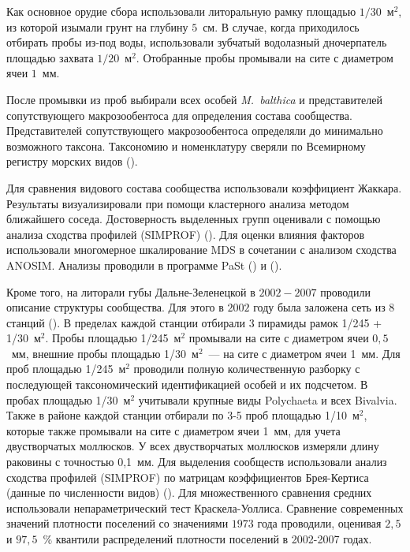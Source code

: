 Как основное орудие сбора использовали литоральную рамку площадью $1/30$~м$^2$, из которой изымали грунт на глубину $5$~см. 
В случае, когда приходилось отбирать пробы из-под воды, использовали зубчатый водолазный дночерпатель площадью захвата $1/20$~м$^2$.
Отобранные пробы промывали на сите с диаметром ячеи $1$~мм. 

После промывки из   проб   выбирали   всех   особей  {\it M.~balthica}  и   представителей   сопутствующего макрозообентоса    для   определения   состава   сообщества.
Представителей   сопутствующего макрозообентоса  определяли   до   минимально   возможного   таксона. Таксономию и номенклатуру сверяли по Всемирному регистру морских видов (\cite{WoRMS}).

Для сравнения видового состава сообщества использовали коэффициент Жаккара. 
Результаты визуализировали при помощи  кластерного анализа методом ближайшего соседа. 
Достоверность выделенных групп оценивали с помощью анализа сходства профилей (SIMPROF) (\cite{Clarke_et_al_2008}).
Для оценки влияния факторов использовали многомерное шкалирование MDS в сочетании с анализом сходства ANOSIM.
Анализы проводили в программе PaSt (\cite{Hammer_et_al_2001}) и \R{} (\cite{R_2014}).

Кроме того, на литорали губы Дальне-Зеленецкой в $2002 - 2007$ проводили описание структуры сообщества. 
Для этого  в $2002$ году была заложена сеть из 8 станций (\cite{Genelt_Dalnezeleneckaya_2008}).
В пределах каждой станции отбирали 3 пирамиды рамок 1/245 + 1/30~м$^2$. 
Пробы площадью 1/245~м$^2$ промывали на сите с диаметром ячеи $0,5$~мм, внешние пробы площадью 1/30~м$^2$~--- на сите с диаметром ячеи 1~мм.  
Для проб площадью 1/245~м$^2$ проводили полную количественную разборку с последующей таксономический идентификацией особей и их подсчетом. 
В пробах  площадью 1/30~м$^2$ учитывали крупные виды Polychaeta и всех Bivalvia. 
Также в районе каждой станции отбирали по 3-5 проб площадью 1/10~м$^2$, которые также промывали на сите с диаметром ячеи 1~мм, для учета двустворчатых моллюсков.  У всех двустворчатых моллюсков измеряли длину раковины с точностью 0,1~мм.
Для выделения сообществ использовали анализ сходства профилей (SIMPROF) по матрицам коэффициентов Брея-Кертиса (данные по численности видов) (\cite{Clarke_et_al_2008}). 
Для множественного сравнения средних использовали непараметрический тест Краскела-Уоллиса.
Сравнение современных значений плотности поселений со значениями $1973$ года проводили, оценивая $2,5$ и $97,5$~\% квантили распределений плотности поселений в 2002-2007 годах.


